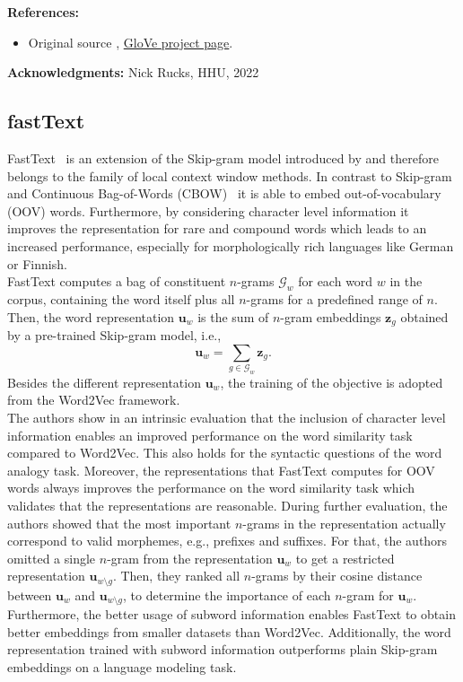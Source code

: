 \documentclass[11pt, a4paper]{amsart}
\begin{document}
\textbf{References:}
\begin{itemize}
	\item Original source \cite{pennington-etal-2014-glove},
	\href{https://nlp.stanford.edu/projects/glove/}{GloVe project page}.
\end{itemize}

{
	\color{gray}
	
	\noindent \textbf{Acknowledgments:} Nick Rucks, HHU, 2022
}


\subsection{fastText}

FastText~\cite{DBLP:journals/corr/BojanowskiGJM16} is an extension of the Skip-gram model introduced by \cite{DBLP:journals/corr/MikolovSCCD13} and therefore belongs to the family of local context window methods. In contrast to Skip-gram and Continuous Bag-of-Words (CBOW)~\cite{DBLP:journals/corr/MikolovSCCD13} it is able to embed out-of-vocabulary (OOV) words. Furthermore, by considering character level information it improves the representation for rare and compound words which leads to an increased performance, especially for morphologically rich languages like German or Finnish.\\

FastText computes a bag of constituent $n$-grams $\mathcal{G}_w$ for each word $w$ in the corpus, containing the word itself plus all $n$-grams for a predefined range of $n$. Then, the word representation $\textbf{u}_w$ is the sum of $n$-gram embeddings $\textbf{z}_g$ obtained by a pre-trained Skip-gram model, i.e.,
\begin{equation}
	\textbf{u}_w = \sum_{g \in \mathcal{G}_w} \textbf{z}_g.
\end{equation}
Besides the different representation $\textbf{u}_w$, the training of the objective is adopted from the Word2Vec framework.\\

The authors show in an intrinsic evaluation that the inclusion of character level information enables an improved performance on the word similarity task compared to Word2Vec. This also holds for the syntactic questions of the word analogy task. Moreover, the representations that FastText computes for OOV words always improves the performance on the word similarity task which validates that the representations are reasonable. During further evaluation, the authors showed that the most important $n$-grams in the representation actually correspond to valid morphemes, e.g., prefixes and suffixes. For that, the authors omitted a single $n$-gram from the representation $\textbf{u}_w$ to get a restricted representation $\textbf{u}_{w\setminus g}$. Then, they ranked all $n$-grams by their cosine distance between $\textbf{u}_w$ and $\textbf{u}_{w\setminus g}$, to determine the importance of each $n$-gram for $\textbf{u}_w$. Furthermore, the better usage of subword information enables FastText to obtain better embeddings from smaller datasets than Word2Vec. Additionally, the word representation trained with subword information outperforms plain Skip-gram embeddings on a language modeling task.
\end{document}
